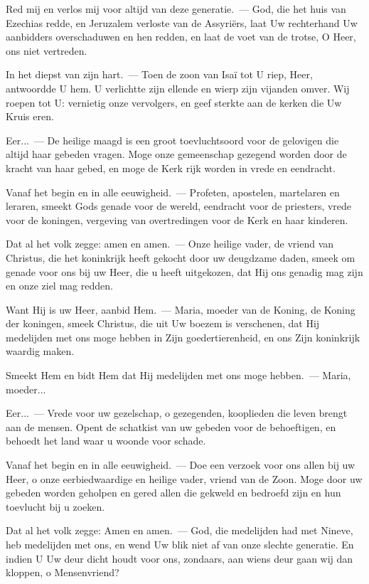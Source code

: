 \documentclass[12pt,twoside,a5paper]{article}
\begin{document}
\begin{halfparskip}
   Red mij en verlos mij voor altijd van deze generatie.~--- God, die het huis van Ezechias redde, en Jeruzalem verloste van de Assyriërs, laat Uw rechterhand Uw aanbidders overschaduwen en hen redden, en laat de voet van de trotse, O Heer, ons niet vertreden.

  In het diepst van zijn hart.~--- Toen de zoon van Isaï tot U riep, Heer, antwoordde U hem. U verlichtte zijn ellende en wierp zijn vijanden omver. Wij roepen tot U: vernietig onze vervolgers, en geef sterkte aan de kerken die Uw Kruis eren.

  Eer...~--- De heilige maagd is een groot toevluchtsoord voor de gelovigen die altijd haar gebeden vragen. Moge onze gemeenschap gezegend worden door de kracht van haar gebed, en moge de Kerk rijk worden in vrede en eendracht.

  Vanaf het begin en in alle eeuwigheid.~--- Profeten, apostelen, martelaren en leraren, smeekt Gods genade voor de wereld, eendracht voor de priesters, vrede voor de koningen, vergeving van overtredingen voor de Kerk en haar kinderen.

  Dat al het volk zegge: amen en amen.~--- Onze heilige vader, de vriend van Christus, die het koninkrijk heeft gekocht door uw deugdzame daden, smeek om genade voor ons bij uw Heer, die u heeft uitgekozen, dat Hij ons genadig mag zijn en onze ziel mag redden.
\end{halfparskip}

\begin{halfparskip}
   Want Hij is uw Heer, aanbid Hem.~--- Maria, moeder van de Koning, de Koning der koningen, smeek Christus, die uit Uw boezem is verschenen, dat Hij medelijden met ons moge hebben in Zijn goedertierenheid, en ons Zijn koninkrijk waardig maken.

  Smeekt Hem en bidt Hem dat Hij medelijden met ons moge hebben.~--- Maria, moeder...

  Eer...~--- Vrede voor uw gezelschap, o gezegenden, kooplieden die leven brengt aan de mensen. Opent de schatkist van uw gebeden voor de behoeftigen, en behoedt het land waar u woonde voor schade.

  Vanaf het begin en in alle eeuwigheid.~--- Doe een verzoek voor ons allen bij uw Heer, o onze eerbiedwaardige en heilige vader, vriend van de Zoon. Moge door uw gebeden worden geholpen en gered allen die gekweld en bedroefd zijn en hun toevlucht bij u zoeken.

  Dat al het volk zegge: Amen en amen.~--- God, die medelijden had met Nineve, heb medelijden met ons, en wend Uw blik niet af van onze slechte generatie. En indien U Uw deur dicht houdt voor ons, zondaars, aan wiens deur gaan wij dan kloppen, o Mensenvriend?
\end{halfparskip}
\end{document}
